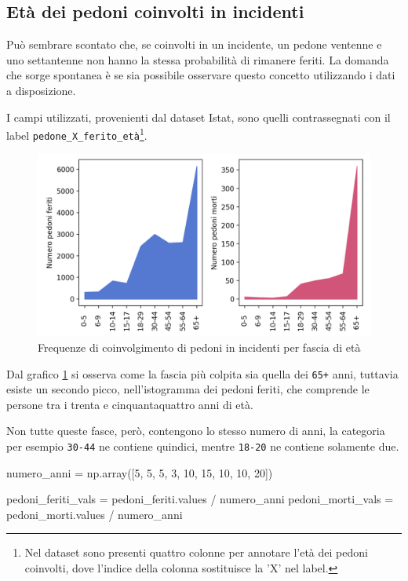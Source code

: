 \documentclass[a4paper,12pt]{report}
\newcommand{\columnstyle}[1]{\texttt{#1}}
\begin{document}
\subsection{Età dei pedoni coinvolti in incidenti}

Può sembrare scontato che, se coinvolti in un incidente, un pedone ventenne e 
uno settantenne non hanno la stessa probabilità di rimanere feriti. 
La domanda che sorge spontanea è se sia possibile osservare questo concetto 
utilizzando i dati a disposizione. 

I campi utilizzati, provenienti dal dataset Istat, sono quelli contrassegnati 
con il label 
\columnstyle{pedone\_X\_ferito\_età}\footnote{Nel dataset sono presenti quattro colonne per 
annotare l'età dei pedoni coinvolti, dove l'indice della colonna sostituisce la 'X' nel label.}. 

\begin{figure}
    \includegraphics[width=\linewidth]{../src/incidenti/incidenti_senza_coords/pedoni/eta_pedoni_iniziale.png}
    \caption{Frequenze di coinvolgimento di pedoni in incidenti per fascia di età}
    \label{fig:eta-pedoni-iniziale}
\end{figure}

Dal grafico \ref{fig:eta-pedoni-iniziale} si osserva come la fascia più colpita 
sia quella dei \columnstyle{65+} anni, tuttavia esiste un secondo picco, nell'istogramma 
dei pedoni feriti, che comprende le persone tra i trenta e cinquantaquattro anni di età. 

Non tutte queste fasce, però, contengono lo stesso numero di anni, 
la categoria per esempio 
\columnstyle{30-44} ne contiene quindici, mentre 
\columnstyle{18-20} ne contiene solamente due. 

\begin{code}[language=Python]
numero_anni = np.array([5, 5, 5, 3, 10, 15, 10, 10, 20])

pedoni_feriti_vals = pedoni_feriti.values / numero_anni
pedoni_morti_vals = pedoni_morti.values / numero_anni
\end{code}
\end{document}
